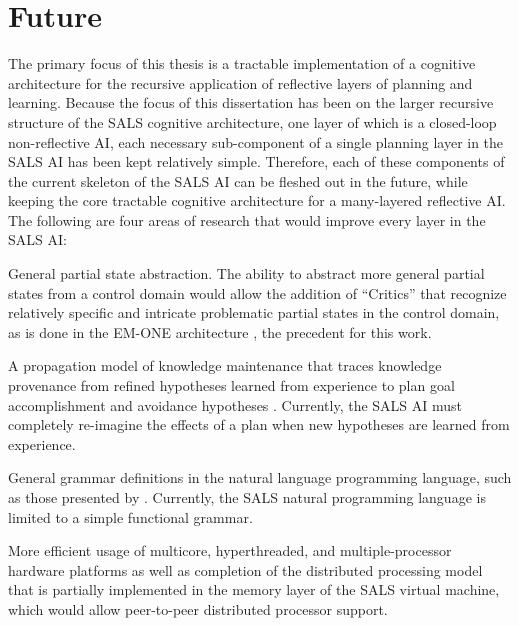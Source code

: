 \chapter{Future}\label{chapter:future}

The primary focus of this thesis is a tractable implementation of a
cognitive architecture for the recursive application of reflective
layers of planning and learning.  Because the focus of this
dissertation has been on the larger recursive structure of the SALS
cognitive architecture, one layer of which is a closed-loop
non-reflective AI, each necessary sub-component of a single planning
layer in the SALS AI has been kept relatively simple.  Therefore, each
of these components of the current skeleton of the SALS AI can be
fleshed out in the future, while keeping the core tractable cognitive
architecture for a many-layered reflective AI.  The following are four
areas of research that would improve every layer in the SALS AI:
\begin{packed_enumerate}
\item{General partial state abstraction.  The ability to abstract more
  general partial states from a control domain would allow the
  addition of ``Critics'' that recognize relatively specific and
  intricate problematic partial states in the control domain, as is
  done in the EM-ONE architecture \cite[]{singh:2005b}, the precedent
  for this work.}
\item{A propagation model of knowledge maintenance that traces
  knowledge provenance from refined hypotheses learned from experience
  to plan goal accomplishment and avoidance hypotheses
  \cite[]{radul:2009}.  Currently, the SALS AI must completely
  re-imagine the effects of a plan when new hypotheses are learned
  from experience.}
\item{General grammar definitions in the natural language programming
  language, such as those presented by \cite{winograd:1970}.
  Currently, the SALS natural programming language is limited to a
  simple functional grammar.}
\item{More efficient usage of multicore, hyperthreaded, and
  multiple-processor hardware platforms as well as completion of the
  distributed processing model that is partially implemented in the
  memory layer of the SALS virtual machine, which would allow
  peer-to-peer distributed processor support.}
\end{packed_enumerate}
